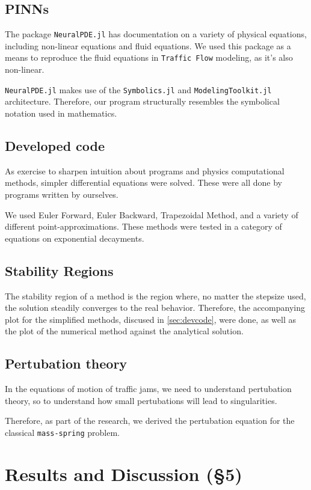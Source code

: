\documentclass[11pt]{article}
\begin{document}
\subsection{PINNs}
\label{sec:orga094dc2}
The package \texttt{NeuralPDE.jl} has documentation on a variety of physical equations,
including non-linear equations and fluid equations. We used this package as a
means to reproduce the fluid equations in \texttt{Traffic Flow} modeling, as it's also
non-linear.

\texttt{NeuralPDE.jl} makes use of the \texttt{Symbolics.jl} and \texttt{ModelingToolkit.jl}
architecture. Therefore, our program structurally resembles the symbolical
notation used in mathematics.

\subsection{Developed code}
\label{sec:orgfd3f49a}
\label{sec:devcode}
As exercise to sharpen intuition about programs and physics computational
methods, simpler differential equations were solved. These were all done by
programs written by ourselves.

We used Euler Forward, Euler Backward, Trapezoidal Method, and a variety of
different point-approximations. These methods were tested in a category of
equations on exponential decayments.

\subsection{Stability Regions}
\label{sec:orgb2f5d6a}
The stability region of a method is the region where, no matter the stepsize
used, the solution steadily converges to the real behavior. Therefore, the
accompanying plot for the simplified methods, discused in \ref{sec:devcode}, were
done, as well as the plot of the numerical method against the analytical solution.

\subsection{Pertubation theory}
\label{sec:org8f98b7a}
In the equations of motion of traffic jams, we need to understand pertubation
theory, so to understand how small pertubations will lead to singularities.

Therefore, as part of the research, we derived the pertubation equation for the
classical \texttt{mass-spring} problem.

\section{Results and Discussion (§5)}
\label{sec:org672e8b6}
\end{document}
